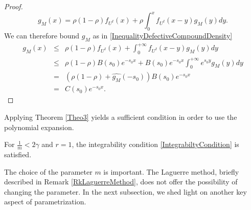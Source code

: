 \begin{proof}
\begin{equation}
g_{M}(x)=\rho(1-\rho)f_{U^{I}}(x)+\rho\int_{0}^{x}f_{U^{I}}(x-y)g_{M}(y)dy.
\end{equation}
We can therefore bound $g_{M}$ as in \eqref{InequalityDefectiveCompoundDensity}
\begin{eqnarray*}
g_{M}(x)&\leq& \rho(1-\rho)f_{U^{I}}(x)+\int_{0}^{+\infty}f_{U^{I}}(x-y)g_{M}(y)dy\\
&\leq& \rho(1-\rho)B(s_{0})e^{-s_{0}x}+B(s_{0})e^{-s_{0}x}\int_{0}^{+\infty}e^{s_{0}y}g_{M}(y)dy\\
&=&(\rho(1-\rho)+\widehat{g_{M}}(-s_{0}))B(s_{0})e^{-s_{0}x}\\
&=&C(s_{0})e^{-s_{0}x}.
\end{eqnarray*}
\end{proof}
Applying Theorem \ref{Theo3} yields a sufficient condition in order to use the polynomial expansion.
\begin{Cor}\label{CoroParam}
For $\frac{1}{m}<2\gamma$ and $r=1$, the integrability condition \eqref{IntegrabiltyCondition} is satisfied.
\end{Cor}
The choice of the parameter $m$ is important. The Laguerre method, briefly described in Remark \ref{RkLaguerreMethod}, does not offer the possibility of changing the parameter. In the next subsection, we shed light on another key aspect of parametrization. 
